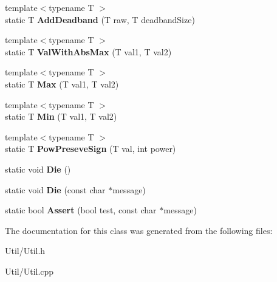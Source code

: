 \begin{DoxyCompactItemize}
\item 
\hypertarget{class_util_afc2afb1ef9fcc6f47277931ffe26b421}{
{\footnotesize template$<$typename T $>$ }\\static \-T {\bfseries \-Add\-Deadband} (\-T raw, \-T deadband\-Size)}
\label{class_util_afc2afb1ef9fcc6f47277931ffe26b421}

\item 
\hypertarget{class_util_ad81fcab61c9cbcbea59a61e68e77ba60}{
{\footnotesize template$<$typename T $>$ }\\static \-T {\bfseries \-Val\-With\-Abs\-Max} (\-T val1, \-T val2)}
\label{class_util_ad81fcab61c9cbcbea59a61e68e77ba60}

\item 
\hypertarget{class_util_a8430d16e2dde9becfe7f6f22f0ed82bf}{
{\footnotesize template$<$typename T $>$ }\\static \-T {\bfseries \-Max} (\-T val1, \-T val2)}
\label{class_util_a8430d16e2dde9becfe7f6f22f0ed82bf}

\item 
\hypertarget{class_util_a58c0162c35e293d94f8fdfe5df4f8df9}{
{\footnotesize template$<$typename T $>$ }\\static \-T {\bfseries \-Min} (\-T val1, \-T val2)}
\label{class_util_a58c0162c35e293d94f8fdfe5df4f8df9}

\item 
\hypertarget{class_util_adf538ad330a0b0962a49b2692d777df2}{
{\footnotesize template$<$typename T $>$ }\\static \-T {\bfseries \-Pow\-Preseve\-Sign} (\-T val, int power)}
\label{class_util_adf538ad330a0b0962a49b2692d777df2}

\item 
\hypertarget{class_util_ace9563b1a67ff4f43c95aafda00978d0}{
static void {\bfseries \-Die} ()}
\label{class_util_ace9563b1a67ff4f43c95aafda00978d0}

\item 
\hypertarget{class_util_a1ad96657e2a363fb601d058d14d5e9d8}{
static void {\bfseries \-Die} (const char $\ast$message)}
\label{class_util_a1ad96657e2a363fb601d058d14d5e9d8}

\item 
\hypertarget{class_util_a49e0d861927bda16820e16dda8dfdc74}{
static bool {\bfseries \-Assert} (bool test, const char $\ast$message)}
\label{class_util_a49e0d861927bda16820e16dda8dfdc74}

\end{DoxyCompactItemize}


\-The documentation for this class was generated from the following files\-:\begin{DoxyCompactItemize}
\item 
\-Util/\-Util.\-h\item 
\-Util/\-Util.\-cpp\end{DoxyCompactItemize}
